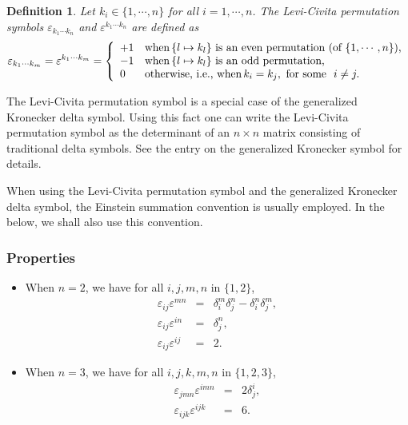\documentclass[12pt]{article}
\newtheorem{defn}{Definition}
\begin{document}
\begin{defn}
Let $k_i \in \{1,\cdots, n\}$ for all $i=1,\cdots ,n$.
The \emph{Levi-Civita permutation symbols} $\varepsilon_{k_1\cdots k_n}$ and $\varepsilon^{k_1\cdots k_n}$ are
defined as
$$\varepsilon_{k_1\cdots k_m}=\varepsilon^{k_1\cdots k_m}= \left\{  \begin {array}{ll} +1 & \mbox{when} \, \{l\mapsto k_l\} \mbox{ is an even permutation (of $\{1,\cdots, n\}$),} \\
-1 & \mbox{when} \, \{l\mapsto k_l\} \mbox{ is an odd permutation,} \\
   0 &  \mbox{otherwise, i.e., when\,} k_i = k_j, \ \mbox {for some } \ i\neq j.  \\
    \end{array} \right. $$
\end{defn}

The Levi-Civita permutation symbol is a special case of  the generalized
Kronecker delta symbol. Using this fact one can write the Levi-Civita permutation
symbol as the determinant of an $n\times n$ matrix consisting of traditional
delta symbols. See the entry on the generalized Kronecker symbol for details.
 

When using the Levi-Civita permutation symbol and the generalized Kronecker delta
symbol, the Einstein summation convention is usually employed. In the below, 
we shall also use this convention.

\subsubsection*{Properties}
\begin{itemize}
\item When $n=2$, we have for all $i,j,m,n$ in $\{1,2\}$, 
\begin{eqnarray}
\label{eq0}
\varepsilon_{ij} \varepsilon^{mn} &=& \delta_i^m \delta_j^n - \delta_i^n \delta_j^m, \\
\label{eq1}
\varepsilon_{ij} \varepsilon^{in} &=& \delta_j^n,\\
\label{eq2}
\varepsilon_{ij} \varepsilon^{ij} &=& 2.
\end{eqnarray}

\item When $n=3$, we have for all $i,j,k,m,n$ in $\{1,2,3\}$, 
\begin{eqnarray}
\label{eq3}
\varepsilon_{jmn} \varepsilon^{imn} &=& 2\delta^i_j, \\
\label{eq4}
\varepsilon_{ijk} \varepsilon^{ijk} &=& 6.
\end{eqnarray}
\end{itemize}
\end{document}
